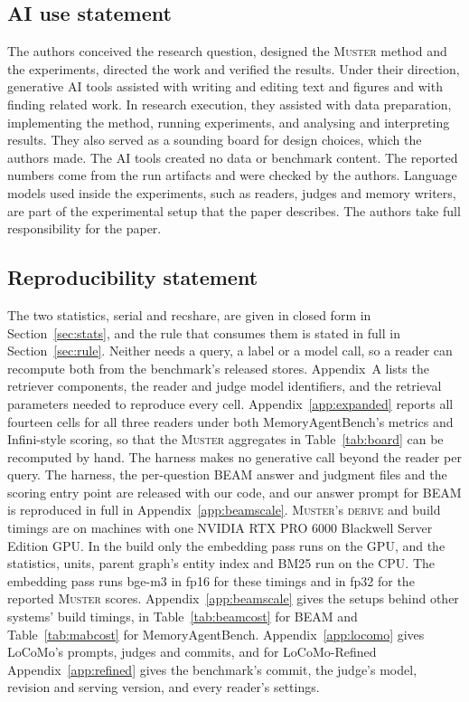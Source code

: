 \documentclass{article}
\newcommand{\sys}{\textsc{Muster}}
\newcommand{\serial}{\textsf{serial}}
\newcommand{\cov}{\textsf{recshare}}
\begin{document}
\subsection*{AI use statement}

The authors conceived the research question, designed the \sys{} method and the experiments, directed the work and
verified the results. Under their direction, generative AI tools assisted with writing and editing text and figures
and with finding related work. In research execution, they assisted with data preparation, implementing the method,
running experiments, and analysing and interpreting results. They also served as a sounding board for design choices,
which the authors made. The AI tools created no data or benchmark content. The reported numbers come from the run
artifacts and were checked by the authors. Language models used inside the experiments, such as readers, judges and
memory writers, are part of the experimental setup that the paper describes. The authors take full responsibility
for the paper.

\subsection*{Reproducibility statement}

The two statistics, \serial{} and \cov{}, are given in closed form in Section~\ref{sec:stats}, and
the rule that consumes them is stated in full in Section~\ref{sec:rule}. Neither needs a query, a label
or a model call, so a reader can recompute both from the benchmark's released stores. Appendix~A lists
the retriever components, the reader and judge model identifiers, and the retrieval parameters needed to
reproduce every cell. Appendix~\ref{app:expanded} reports all fourteen cells for all three readers
under both MemoryAgentBench's metrics and Infini-style scoring, so that the \sys{} aggregates in Table~\ref{tab:board} can
be recomputed by hand. The harness makes no generative call beyond the reader per
query. The harness, the per-question BEAM answer and judgment files and {\color{blue}the scoring entry point are released
with our code}, and our answer prompt for BEAM is reproduced in full in
Appendix~\ref{app:beamscale}. \sys{}'s \textsc{derive} and build timings are on machines with one NVIDIA RTX PRO 6000 Blackwell Server Edition GPU. In the build only the embedding pass runs on the GPU, and the statistics, units, parent graph's entity index and BM25 run on the CPU. The embedding pass runs bge-m3 in fp16 for these timings and in fp32 for the reported \sys{} scores. Appendix~\ref{app:beamscale} gives the setups behind other systems' build timings, in Table~\ref{tab:beamcost} for BEAM and Table~\ref{tab:mabcost} for MemoryAgentBench. Appendix~\ref{app:locomo} gives LoCoMo's prompts, judges and commits, and for LoCoMo-Refined Appendix~\ref{app:refined} gives the benchmark's commit, the judge's model, revision and serving version, and every reader's settings.
\end{document}
